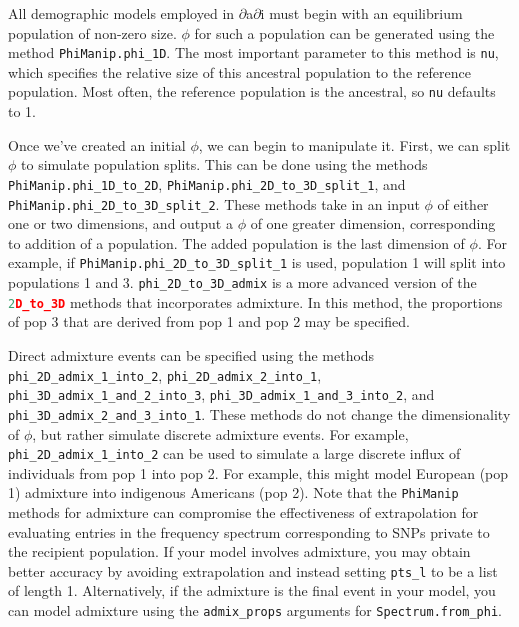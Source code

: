 \documentclass[12pt]{article}
\makeatletter
\newcommand{\dadi}{$\partial$a$\partial$i\xspace}
\newcommand{\py}[1]{\lstinline[language=Python, showstringspaces=False]@#1@}
\makeatother
\begin{document}
All demographic models employed in \dadi must begin with an equilibrium population of non-zero size.
$\phi$ for such a population can be generated using the method \py{PhiManip.phi_1D}.
The most important parameter to this method is \py{nu}, which specifies the relative size of this ancestral population to the reference population.
Most often, the reference population is the ancestral, so \py{nu} defaults to 1.

Once we've created an initial $\phi$, we can begin to manipulate it.
First, we can split $\phi$ to simulate population splits.
This can be done using the methods \py{PhiManip.phi_1D_to_2D}, \py{PhiManip.phi_2D_to_3D_split_1}, and \py{PhiManip.phi_2D_to_3D_split_2}.
These methods take in an input $\phi$ of either one or two dimensions, and output a $\phi$ of one greater dimension, corresponding to addition of a population.
The added population is the last dimension of $\phi$.
For example, if \py{PhiManip.phi_2D_to_3D_split_1} is used, population 1 will split into populations 1 and 3.
\py{phi_2D_to_3D_admix} is a more advanced version of the \py{2D_to_3D} methods that incorporates admixture.
In this method, the proportions of pop 3 that are derived from pop 1 and pop 2 may be specified.

Direct admixture events can be specified using the methods \py{phi_2D_admix_1_into_2}, \py{phi_2D_admix_2_into_1}, \py{phi_3D_admix_1_and_2_into_3}, \py{phi_3D_admix_1_and_3_into_2}, and \py{phi_3D_admix_2_and_3_into_1}.
These methods do not change the dimensionality of $\phi$, but rather simulate discrete admixture events.
For example, \py{phi_2D_admix_1_into_2} can be used to simulate a large discrete influx of individuals from pop 1 into pop 2.
For example, this might model European (pop 1) admixture into indigenous Americans (pop 2).
Note that the \py{PhiManip} methods for admixture can compromise the effectiveness of extrapolation for evaluating entries in the frequency spectrum corresponding to SNPs private to the recipient population.
If your model involves admixture, you may obtain better accuracy by avoiding extrapolation and instead setting \py{pts_l} to be a list of length 1.
Alternatively, if the admixture is the final event in your model, you can model admixture using the \py{admix_props} arguments for \py{Spectrum.from_phi}.
\end{document}
